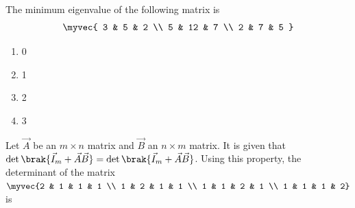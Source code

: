 \item The minimum eigenvalue of the following matrix is  
\hfill {}
\begin{align*}
    \myvec{ 3 & 5 & 2 \\ 5 & 12 & 7 \\ 2 & 7 & 5 }
\end{align*}
\begin{multicols}{4}
  \begin{enumerate}
\item 0
\item 1
\item 2
\item 3
\end{enumerate}
\end{multicols}
\item Let $\vec{A}$ be an $m \times n$ matrix and $\vec{B}$ an $n \times m$ matrix. It is given that $\det\brak{\vec{I}_m + \vec{A}\vec{B}} = \det\brak{\vec{I}_m + \vec{A}\vec{B}}$. Using this property, the determinant of the matrix
$\myvec{2 & 1 & 1 & 1 \\
1 & 2 & 1 & 1 \\
1 & 1 & 2 & 1 \\
1 & 1 & 1 & 2}$
is

